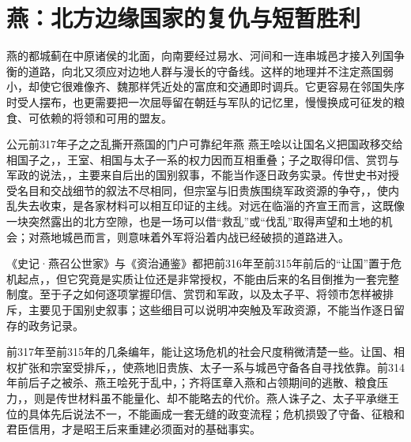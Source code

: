 \section{燕：北方边缘国家的复仇与短暂胜利}

燕的都城蓟在中原诸侯的北面，向南要经过易水、河间和一连串城邑才接入列国争衡的道路，向北又须应对边地人群与漫长的守备线。这样的地理并不注定燕国弱小，却使它很难像齐、魏那样凭近处的富庶和交通即时调兵。它更容易在邻国失序时受人摆布，也更需要把一次屈辱留在朝廷与军队的记忆里，慢慢换成可征发的粮食、可依赖的将领和可用的盟友。

\begin{event}{公元前317年}{子之之乱撕开燕国的门户}{可靠纪年}{燕}
燕王哙以让国名义把国政移交给相国子之，，王室、相国与太子一系的权力因而互相重叠；子之取得印信、赏罚与军政的说法，，主要来自后出的国别叙事，不能当作逐日政务实录。传世史书对授受名目和交战细节的叙法不尽相同，但宗室与旧贵族围绕军政资源的争夺，，使内乱失去收束，是各家材料可以相互印证的主线。对远在临淄的齐宣王而言，这既像一块突然露出的北方空隙，也是一场可以借“救乱”或“伐乱”取得声望和土地的机会；对燕地城邑而言，则意味着外军将沿着内战已经破损的道路进入。

《史记·燕召公世家》与《资治通鉴》都把前316年至前315年前后的“让国”置于危机起点，，但它究竟是实质让位还是非常授权，不能由后来的名目倒推为一套完整制度。至于子之如何逐项掌握印信、赏罚和军政，以及太子平、将领市怎样被排斥，主要见于国别史叙事；这些细目可以说明冲突触及军政资源，不能当作逐日留存的政务记录。
\end{event}

前317年至前315年的几条编年，能让这场危机的社会尺度稍微清楚一些。让国、相权扩张和宗室受排斥，，使燕地旧贵族、太子一系与城邑守备各自寻找依靠。前314年前后子之被杀、燕王哙死于乱中，；齐将匡章入燕和占领期间的逃散、粮食压力，，则是传世材料虽不能量化、却不能略去的代价。燕人诛子之、太子平承继王位的具体先后说法不一，不能画成一套无缝的政变流程；危机损毁了守备、征粮和君臣信用，才是昭王后来重建必须面对的基础事实。


